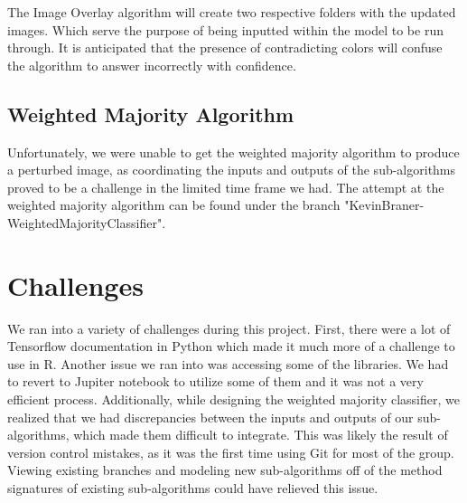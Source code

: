 \documentclass{article}
\begin{document}
The Image Overlay algorithm will create two respective folders with the updated images. Which serve the purpose of being inputted within the model to be run through. It is anticipated that the presence of contradicting colors will confuse the algorithm to answer incorrectly with confidence. 

\subsection{Weighted Majority Algorithm}
Unfortunately, we were unable to get the weighted majority algorithm to produce a perturbed image, as coordinating the inputs and outputs of the sub-algorithms proved to be a challenge in the limited time frame we had. The attempt at the weighted majority algorithm can be found under the branch "KevinBraner-WeightedMajorityClassifier".

\section{Challenges}
We ran into a variety of challenges during this project. First, there were a lot of Tensorflow documentation in Python which made it much more of a challenge to use in R. Another issue we ran into was accessing some of the libraries. We had to revert to Jupiter notebook to utilize some of them and it was not a very efficient process. Additionally, while designing the weighted majority classifier, we realized that we had discrepancies between the inputs and outputs of our sub-algorithms, which made them difficult to integrate. This was likely the result of version control mistakes, as it was the first time using Git for most of the group. Viewing existing branches and modeling new sub-algorithms off of the method signatures of existing sub-algorithms could have relieved this issue.
\end{document}
